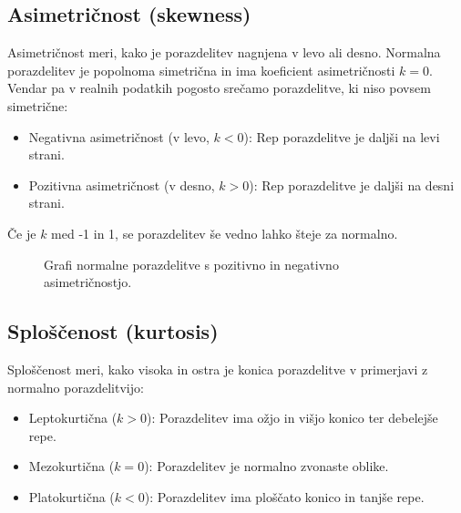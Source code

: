 \subsection{Asimetričnost (skewness)}

Asimetričnost meri, kako je porazdelitev nagnjena v levo ali desno. Normalna porazdelitev je popolnoma simetrična in ima koeficient asimetričnosti $k = 0$. Vendar pa v realnih podatkih pogosto srečamo porazdelitve, ki niso povsem simetrične:

\begin{itemize}
    \item Negativna asimetričnost (v levo, $k < 0$): Rep porazdelitve je daljši na levi strani.
    \item Pozitivna asimetričnost (v desno, $k > 0$): Rep porazdelitve je daljši na desni strani.
\end{itemize}

Če je $k$ med -1 in 1, se porazdelitev še vedno lahko šteje za normalno.

\begin{figure}
\centering
{}
\caption{Grafi normalne porazdelitve s pozitivno in negativno asimetričnostjo.}
\end{figure}

\subsection{Sploščenost (kurtosis)}

Sploščenost meri, kako visoka in ostra je konica porazdelitve v primerjavi z normalno porazdelitvijo:

\begin{itemize}
    \item Leptokurtična ($k > 0$): Porazdelitev ima ožjo in višjo konico ter debelejše repe.
    \item Mezokurtična ($k = 0$): Porazdelitev je normalno zvonaste oblike.
    \item Platokurtična ($k < 0$): Porazdelitev ima ploščato konico in tanjše repe.
\end{itemize}

